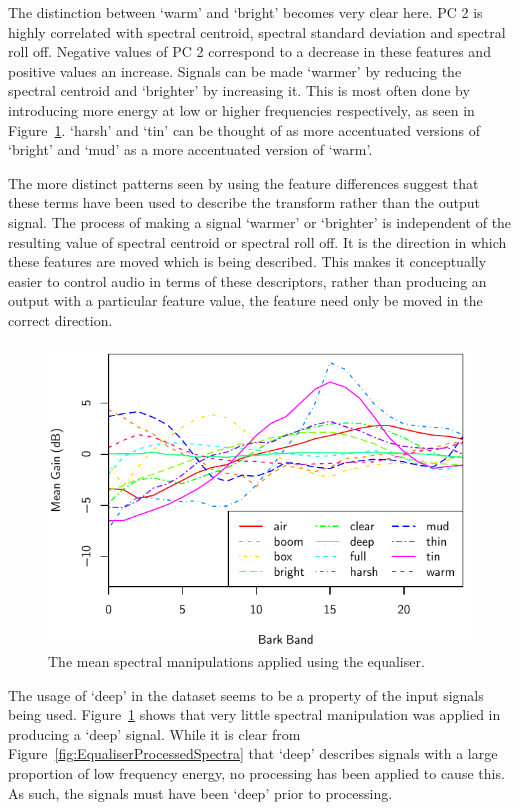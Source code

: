 			The distinction between `warm' and `bright' becomes very clear here. PC 2 is highly correlated with
			spectral centroid, spectral standard deviation and spectral roll off. Negative values of PC 2
			correspond to a decrease in these features and positive values an increase. Signals can be made
			`warmer' by reducing the spectral centroid and `brighter' by increasing it. This is most often done
			by introducing more energy at low or higher frequencies respectively, as seen in
			Figure~\ref{fig:EqualiserDifferenceSpectra}. `harsh' and `tin' can be thought of as more
			accentuated versions of `bright' and `mud' as a more accentuated version of `warm'.

			The more distinct patterns seen by using the feature differences suggest that these terms have been
			used to describe the transform rather than the output signal. The process of making a signal
			`warmer' or `brighter' is independent of the resulting value of spectral centroid or spectral roll
			off. It is the direction in which these features are moved which is being described. This makes it
			conceptually easier to control audio in terms of these descriptors, rather than producing an output
			with a particular feature value, the feature need only be moved in the correct direction.

			\begin{figure}[h!]
				\centering
				\includegraphics{chapter4/Images/EqualiserDifferenceSpectra.pdf}
				\caption{The mean spectral manipulations applied using the equaliser.}
				\label{fig:EqualiserDifferenceSpectra}
			\end{figure}

			The usage of `deep' in the dataset seems to be a property of the input signals being used.
			Figure~\ref{fig:EqualiserDifferenceSpectra} shows that very little spectral manipulation was
			applied in producing a `deep' signal. While it is clear from
			Figure~\ref{fig:EqualiserProcessedSpectra} that `deep' describes signals with a large proportion of
			low frequency energy, no processing has been applied to cause this. As such, the signals must have
			been `deep' prior to processing.

